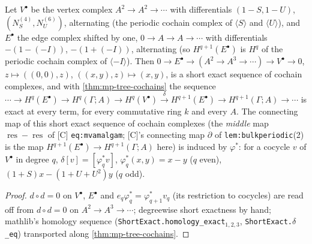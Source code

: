 \begin{theorem}\label{thm:mp-tree-mv}
  \leanok
  Let $V^\bullet$ be the vertex complex $A^2\to A^2\to\cdots$ with differentials $(1-S,1-U)$, $(N_S^{(4)},N_U^{(6)})$, alternating
  (the periodic cochain complex of $\langle S\rangle$ and $\langle U\rangle$), and $E^\bullet$ the edge complex shifted by one,
  $0\to A\to A\to\cdots$ with differentials $-(1-(-I))$, $-(1+(-I))$, alternating (so $H^{q+1}(E^\bullet)$ is $H^q$ of the
  periodic cochain complex of $\langle-I\rangle$).  Then $0\to E^\bullet\to(A^2\to A^3\to\cdots)\to V^\bullet\to0$,
  $z\mapsto((0,0),z)$, $((x,y),z)\mapsto(x,y)$, is a short exact sequence of cochain complexes, and with \ref{thm:mp-tree-cochains}
  the sequence
  $\cdots\to H^q(E^\bullet)\to H^q(\Gamma;A)\to H^q(V^\bullet)\xrightarrow{\delta}H^{q+1}(E^\bullet)\to H^{q+1}(\Gamma;A)\to\cdots$
  is exact at every term, for every commutative ring $k$ and every $A$.  The connecting map of this short exact sequence of
  cochain complexes (the \emph{middle} map $\operatorname{res}-\operatorname{res}$ of [C] \texttt{eq:mvamalgam}; [C]'s connecting map $\partial$ of
  \texttt{lem:bulkperiodic}(2) is the map $H^{q+1}(E^\bullet)\to H^{q+1}(\Gamma;A)$ here) is induced by $\varphi^*$:
  for a cocycle $v$ of $V^\bullet$ in degree $q$, $\delta[v]=[\varphi^*_q v]$, $\varphi^*_q(x,y)=x-y$ ($q$ even),
  $(1+S)x-(1+U+U^2)y$ ($q$ odd).
\end{theorem}
\begin{proof}
  \leanok
  $d\circ d=0$ on $V^\bullet$, $E^\bullet$ and $e_q\varphi^*_q=\varphi^*_{q+1}v_q$ (its restriction to cocycles) are read off from $d\circ d=0$ on $A^2\to A^3\to\cdots$;
  degreewise short exactness by hand; mathlib's homology sequence (\texttt{ShortExact.homology\_exact$_{1,2,3}$},
  \texttt{ShortExact.$\delta$\_eq}) transported along \ref{thm:mp-tree-cochains}.
\end{proof}

